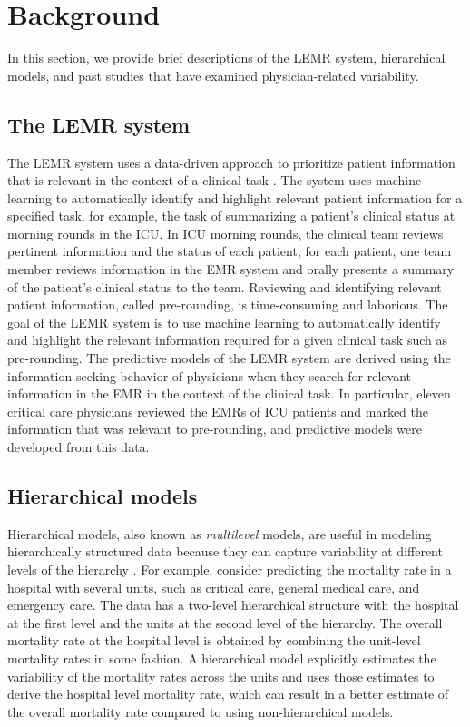 \section{Background}\label{sec:background}
In this section, we provide brief descriptions of the LEMR system, hierarchical models, and past studies that have examined physician-related variability.

\subsection{The LEMR system}\label{sec:lemr}
The LEMR system uses a data-driven approach to prioritize patient information that is relevant in the context of a clinical task \cite{King2018,King2019}. The system uses machine learning to automatically identify and highlight relevant patient information for a specified task, for example, the task of summarizing a patient’s clinical status at morning rounds in the ICU. In ICU morning rounds, the clinical team reviews pertinent information and the status of each patient; for each patient, one team member reviews information in the EMR system and orally presents a summary of the patient’s clinical status to the team. Reviewing and identifying relevant patient information, called pre-rounding, is time-consuming and laborious. The goal of the LEMR system is to use machine learning to automatically identify and highlight the relevant information required for a given clinical task such as pre-rounding. The predictive models of the LEMR system are derived using the information-seeking behavior of physicians when they search for relevant information in the EMR in the context of the clinical task. In particular, eleven critical care physicians reviewed the EMRs of ICU patients and marked the information that was relevant to pre-rounding, and predictive models were developed from this data.

\subsection{Hierarchical models}

Hierarchical models, also known as \textit{multilevel} models, are useful in modeling hierarchically structured data because they can capture variability at different levels of the hierarchy \cite{gelman2006data}. For example, consider predicting the mortality rate in a hospital with several units, such as critical care, general medical care, and emergency care. The data has a two-level hierarchical structure with the hospital at the first level and the units at the second level of the hierarchy. The overall mortality rate at the hospital level is obtained by combining the unit-level mortality rates in some fashion. A hierarchical model explicitly estimates the variability of the mortality rates across the units and uses those estimates to derive the hospital level mortality rate, which can result in a better estimate of the overall mortality rate compared to using non-hierarchical models.

